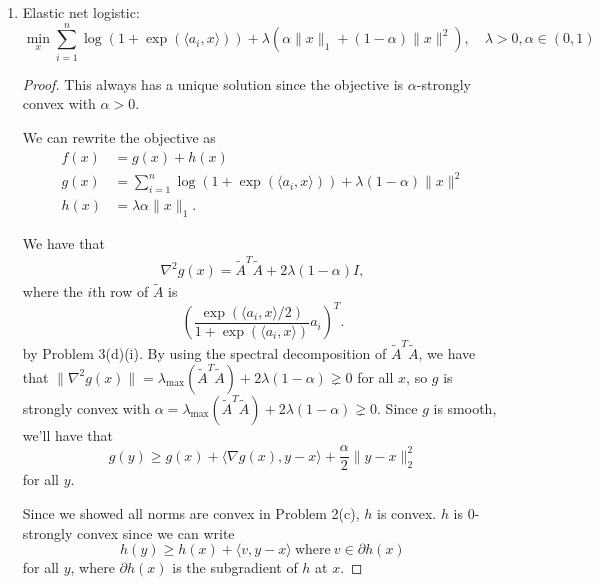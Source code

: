 \documentclass[11pt]{amsart}
\begin{document}
\begin{enumerate}
\begin{enumerate}
\begin{enumerate}
\begin{proof}
    For $x$ to be a unique minimizer, $A^TAx = A^Tb$ must have a unique
    solution. This will occur if and only if the null space of $A^TA$ is the
    empty set, that is, $A^TA$ is positive definite.
  \end{proof}
\item Elastic net logistic: 
\[
\min_x \sum_{i=1}^n \log(1 + \exp(\langle a_i, x\rangle)) + \lambda(\alpha \|x\|_1 + (1-\alpha)\|x\|^2), \quad \lambda>0, \alpha \in (0,1)
\]

\begin{proof}
  This always has a unique solution since the objective is $\alpha$-strongly
  convex with $\alpha > 0$.
  
  We can rewrite the objective as
  \begin{align*}
    f(x) &= g(x) + h(x)\\
    g(x) &= \sum_{i=1}^n \log(1 + \exp(\langle a_i, x\rangle)) + \lambda(1-\alpha)\|x\|^2 \\
    h(x) &= \lambda\alpha \|x\|_1.
  \end{align*}  

  We have that
  \begin{align*}
    \nabla^2 g(x) = \tilde{A}^T\tilde{A} + 2\lambda(1 - \alpha)I,
  \end{align*}
  where the $i$th row of $\tilde{A}$ is
  $$
  \left(\frac{\exp(\langle a_i , x \rangle / 2)}{1 + \exp(\langle a_i , x \rangle)}a_i\right)^T.
  $$
  by Problem 3(d)(i). By using the spectral decomposition of
  $\tilde{A}^T\tilde{A}$, we have that
  $\lVert \nabla^2 g(x) \rVert =
  \lambda_{\operatorname{max}}\left(\tilde{A}^T\tilde{A}\right) + 2\lambda(1 -
  \alpha) \gneq 0$ for all $x$, so $g$ is strongly convex with
  $\alpha = \lambda_{\operatorname{max}}\left(\tilde{A}^T\tilde{A}\right) +
  2\lambda(1 - \alpha) \gneq 0$. Since $g$ is smooth, we'll have that
  $$
  g(y) \geq g(x) + \langle \nabla g(x), y - x \rangle + \frac{\alpha}{2}\lVert y - x\rVert_2^2
  $$
  for all $y$.

  Since we showed all norms are convex in Problem 2(c), $h$ is convex. $h$ is
  $0$-strongly convex since we can write
  $$
  h(y) \geq h(x) + \langle v, y - x \rangle~\text{where}~v \in \partial h(x)
  $$
  for all $y$, where $\partial h(x)$ is the subgradient of $h$ at $x$.


\end{proof}
\end{enumerate}
\end{enumerate}
\end{enumerate}
\end{document}
